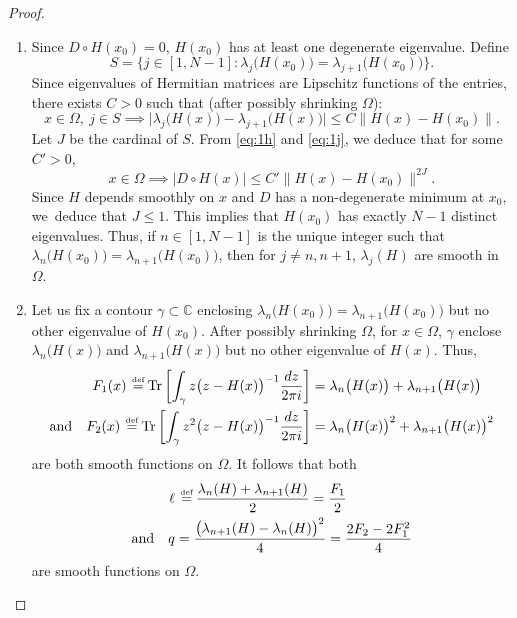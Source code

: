 \documentclass[JEP,XML,SOM,Unicode,NoFloatCountersInSection]{cedram}
\let\sep:
\theoremstyle{definition}
\DeclareMathOperator{\Tr}{Tr}
\newcommand{\C}{\mathbb{C}}
\newcommand{\de}{\,\mathrel{\stackrel{\makebox[0pt]{\mbox{\normalfont\tiny def}}}{=}}}
\begin{document}
\begin{proof}
\begin{enumerate}
\item
Since $D \circ H(x_0) = 0$, $H(x_0)$ has at least one degenerate eigenvalue. Define\vspace*{-3pt}
\begin{equation*}
S = \bigl\{ j \in [1,N-1]\sep \lambda_j\bigl( H(x_0) \bigr) = \lambda_{j+1}\bigl( H(x_0) \bigr) \bigr\}.
\end{equation*}
Since eigenvalues of Hermitian matrices are Lipschitz functions of the entries, there exists $C > 0$ such that (after possibly shrinking $\Omega$):
\begin{equation}\label{eq:1j}
x\in \Omega, \ j \in S \implies
\big|\lambda_j \bigl( H(x) \bigr) - \lambda_{j+1} \bigl( H(x) \bigr)\big| \leq C \big\| H(x)-H(x_0)\big\|.
\end{equation}
Let $J$ be the cardinal of $S$. From \eqref{eq:1h} and \eqref{eq:1j}, we deduce that for some $C' > 0$,\vspace*{-3pt}
\begin{equation*}
x\in \Omega \implies \big| D \circ H(x) \big| \leq C' \big\| H(x)-H(x_0)\big\|^{2J}.
\end{equation*}
Since $H$ depends smoothly on $x$ and $D$ has a non-degenerate minimum at $x_0$, we~deduce that $J \leq 1$. This implies that $H(x_0)$ has exactly $N-1$ distinct eigenvalues. Thus, if $n \in [1,N-1]$ is the unique integer such that $\lambda_n\bigl( H(x_0) \bigr) = \lambda_{n+1}\bigl( H(x_0)\bigr)$, then for $j \neq n, n+1$, $\lambda_j(H)$ are smooth in $\Omega$.

\item
Let us fix a contour $\gamma \subset \C$ enclosing $\lambda_n\bigl(H(x_0)\bigr) = \lambda_{n+1}\bigl(H(x_0)\bigr)$ but no other eigenvalue of $H(x_0)$. After possibly shrinking $\Omega$, for $x \in \Omega$, $\gamma$ enclose $\lambda_n\bigl(H(x)\bigr)$ and $\lambda_{n+1}\bigl(H(x)\bigr)$ but no other eigenvalue of $H(x)$. Thus,\vspace*{-3pt}
\begin{equation}\label{eq:0a}
\begin{split}
F_1(x) \de \Tr \left[ \int_\gamma z \bigl(z-H(x)\bigr)^{-1} \dfrac{dz}{2\pi i} \right] &= \lambda_n\bigl(H(x)\bigr) + \lambda_{n+1}\bigl(H(x)\bigr)
\\
\text{and} \quad F_2(x) \de \Tr \left[ \int_\gamma z^2 \bigl(z-H(x)\bigr)^{-1} \dfrac{dz}{2\pi i} \right] &= \lambda_n\bigl(H(x)\bigr)^2 + \lambda_{n+1}\bigl(H(x)\bigr)^2
\end{split}
\end{equation}
are both smooth functions on $\Omega$. It follows that both
\begin{equation}\label{eq:1m}
\begin{split}
\ell &\de \dfrac{\lambda_n(H) + \lambda_{n+1}(H)}{2} = \dfrac{F_1}{2} \\
\text{and} \quad q &= \dfrac{\bigl(\lambda_{n+1}(H) - \lambda_n(H)\bigr)^2}{4} = \dfrac{2F_2-2F_1^2}{4}
\end{split}
\end{equation}
are smooth functions on $\Omega$.


\end{enumerate}
\end{proof}
\end{document}
